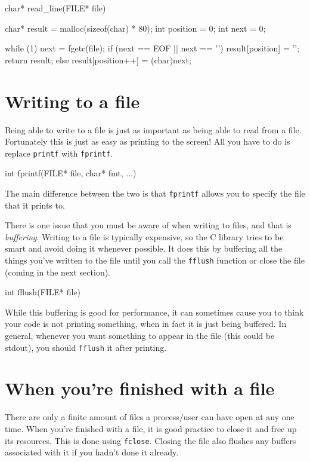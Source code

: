 \begin{codeblock}
char* read_line(FILE* file)
{
    char* result = malloc(sizeof(char) * 80);
    int position = 0;
    int next = 0;

    while (1) {
        next = fgetc(file);
        if (next == EOF || next == '\n') {
            result[position] = '\0';
            return result;
        } else {
            result[position++] = (char)next;
        }
    }
}
\end{codeblock}

\section{Writing to a file}

Being able to write to a file is just as important as being able to read from a file.
Fortunately this is just as easy as printing to the screen!
All you have to do is replace \texttt{printf} with \texttt{fprintf}.

\begin{codeinline}
int fprintf(FILE* file, char* fmt, ...)
\end{codeinline}

The main difference between the two is that \texttt{fprintf} allows you to specify the file that it prints to.

There is one issue that you must be aware of when writing to files, and that is \emph{buffering}. 
Writing to a file is typically expensive, so the C library tries to be smart and avoid doing it whenever possible.
It does this by buffering all the things you've written to the file until you call the \texttt{fflush} function or close the file (coming in the next section).

\begin{codeinline}
int fflush(FILE* file)
\end{codeinline}

While this buffering is good for performance, it can sometimes cause you to think your code is not printing something, when in fact it is just being buffered.
In general, whenever you want something to appear in the file (this could be stdout), you should \texttt{fflush} it after printing.

\section{When you're finished with a file}

There are only a finite amount of files a process/user can have open at any one time.
When you're finished with a file, it is good practice to close it and free up its resources.
This is done using \texttt{fclose}.
Closing the file also flushes any buffers associated with it if you hadn't done it already.

